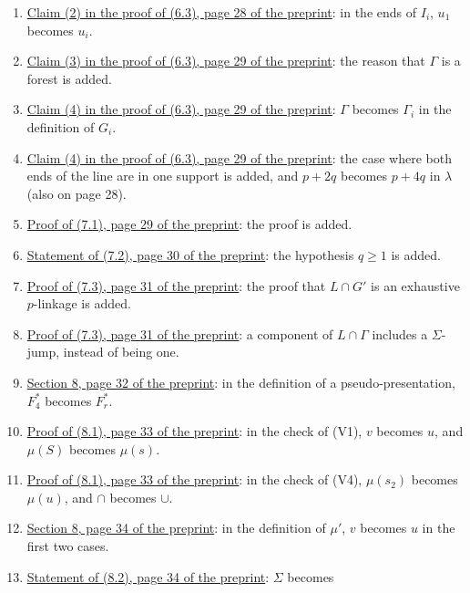 \begin{enumerate}
the case where both ends of the line are in one support is added.
\item {}\hyperref[fix:6.3-claim2-supports]{Claim (2) in the proof of (6.3), page 28 of the
preprint}: in the ends of $I_i$, $u_1$ becomes $u_i$.
\item {}\hyperref[fix:6.3-claim3]{Claim (3) in the proof of (6.3), page 29 of the preprint}: the
reason that $\Gamma$ is a forest is added.
\item {}\hyperref[fix:6.3-claim4-Gi]{Claim (4) in the proof of (6.3), page 29 of the preprint}:
$\Gamma$ becomes $\Gamma_i$ in the definition of $G_i$.
\item {}\hyperref[fix:6.3-claim4-support]{Claim (4) in the proof of (6.3), page 29 of the
preprint}: the case where both ends of the line are in one support is added, and $p + 2q$
becomes $p + 4q$ in $\lambda$ (also on page 28).
\item {}\hyperref[fix:7.1-proof-added]{Proof of (7.1), page 29 of the preprint}: the proof is added.
\item {}\hyperref[fix:7.2]{Statement of (7.2), page 30 of the preprint}: the hypothesis $q \ge 1$
is added.
\item {}\hyperref[fix:7.3-linkage-proof-added]{Proof of (7.3), page 31 of the preprint}: the proof that $L \cap G'$ is an exhaustive $p$-linkage is added.
\item {}\hyperref[fix:7.3-proof]{Proof of (7.3), page 31 of the preprint}: a component of
$L \cap \Gamma$ includes a $\Sigma$-jump, instead of being one.
\item {}\hyperref[fix:8-pseudo]{Section 8, page 32 of the preprint}: in the definition of a
pseudo-presentation, $F_4^*$ becomes $F_r^*$.
\item {}\hyperref[fix:8.1-proof-V1]{Proof of (8.1), page 33 of the preprint}: in the check of (V1),
$v$ becomes $u$, and $\mu(S)$ becomes $\mu(s)$.
\item {}\hyperref[fix:8.1-proof]{Proof of (8.1), page 33 of the preprint}: in the check of (V4),
$\mu(s_2)$ becomes $\mu(u)$, and $\cap$ becomes $\cup$.
\item {}\hyperref[fix:8-mu]{Section 8, page 34 of the preprint}: in the definition of $\mu'$, $v$
becomes $u$ in the first two cases.
\item {}\hyperref[fix:8.2]{Statement of (8.2), page 34 of the preprint}: $\Sigma$ becomes

\end{enumerate}

